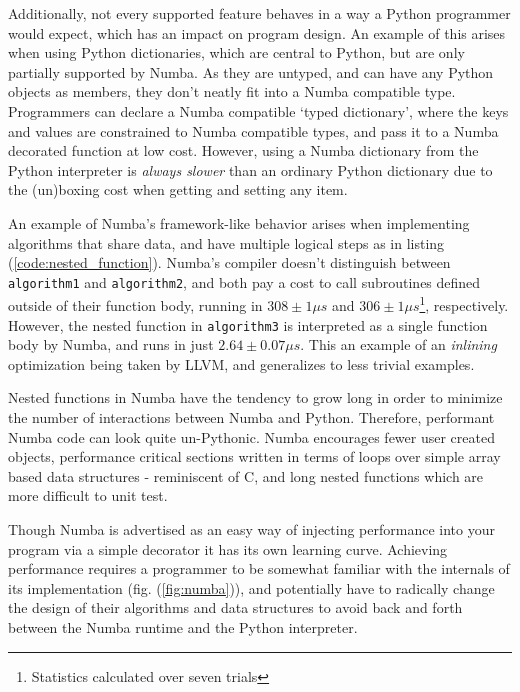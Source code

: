 \documentclass{IEEEcsmag}
\begin{document}
Additionally, not every supported feature behaves in a way a Python programmer would expect, which has an impact on program design. An example of this arises when using Python dictionaries, which are central to Python, but are only partially supported by Numba. As they are untyped, and can have any Python objects as members, they don't neatly fit into a Numba compatible type. Programmers can declare a Numba compatible `typed dictionary', where the keys and values are constrained to Numba compatible types, and pass it to a Numba decorated function at low cost. However, using a Numba dictionary from the Python interpreter is \textit{always slower} than an ordinary Python dictionary due to the (un)boxing cost when getting and setting any item.

An example of Numba's framework-like behavior arises when implementing algorithms that share data, and have multiple logical steps as in listing (\ref{code:nested_function}). Numba's compiler doesn't distinguish between \lstinline{algorithm1} and \lstinline{algorithm2}, and both pay a cost to call subroutines defined outside of their function body, running in $308 \pm 1 \mu s$ and $306 \pm 1 \mu s$\footnote{Statistics calculated over seven trials}, respectively. However, the nested function in \lstinline{algorithm3} is interpreted as a single function body by Numba, and runs in just $2.64 \pm 0.07 \mu s$. This an example of an \textit{inlining} optimization being taken by LLVM, and generalizes to less trivial examples.

Nested functions in Numba have the tendency to grow long in order to minimize the number of interactions between Numba and Python. Therefore, performant Numba code can look quite un-Pythonic. Numba encourages fewer user created objects, performance critical sections written in terms of loops over simple array based data structures - reminiscent of C, and long nested functions which are more difficult to unit test.

Though Numba is advertised as an easy way of injecting performance into your program via a simple decorator it has its own learning curve. Achieving performance requires a programmer to be somewhat familiar with the internals of its implementation (fig. (\ref{fig:numba})), and potentially have to radically change the design of their algorithms and data structures to avoid back and forth between the Numba runtime and the Python interpreter.
\end{document}
